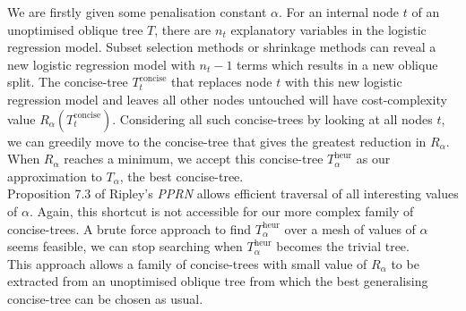 We are firstly given some penalisation constant $\alpha$. For an internal node $t$ of an unoptimised oblique tree $T$, there are $n_t$ explanatory variables in the logistic regression model. Subset selection methods or shrinkage methods can reveal a new logistic regression model with $n_t-1$ terms which results in a new oblique split. The concise-tree $T_t^{\mbox{concise}}$ that replaces node $t$ with this new logistic regression model and leaves all other nodes untouched will have cost-complexity value $R_\alpha(T_t^{\mbox{concise}})$. Considering all such concise-trees by looking at all nodes $t$, we can greedily move to the concise-tree that gives the greatest reduction in $R_\alpha$. When $R_\alpha$ reaches a minimum, we accept this concise-tree $T_\alpha^{\mbox{heur}}$ as our approximation to $T_\alpha$, the best concise-tree.\\

Proposition 7.3 of Ripley's \emph{PPRN} allows efficient traversal of all interesting values of $\alpha$. Again, this shortcut is not accessible for our more complex family of concise-trees. A brute force approach to find $T_\alpha^{\mbox{heur}}$ over a mesh of values of $\alpha$ seems feasible, we can stop searching when $T_\alpha^{\mbox{heur}}$ becomes the trivial tree. \\

This approach allows a family of concise-trees with small value of $R_\alpha$ to be extracted from an unoptimised oblique tree from which the best generalising concise-tree can be chosen as usual.